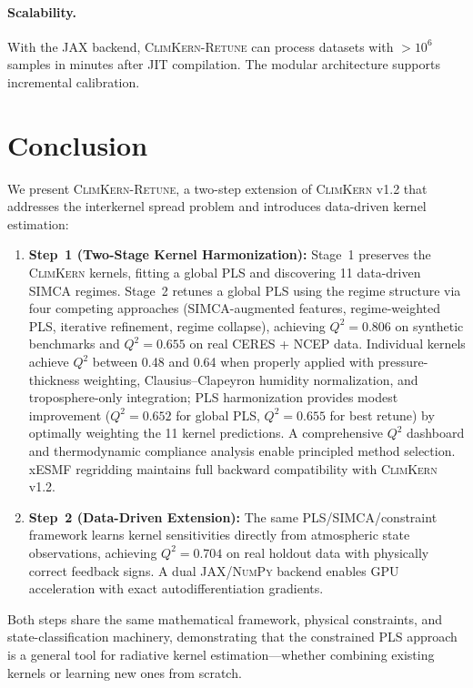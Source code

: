 \documentclass[11pt]{article}
\newcommand{\Qsq}{Q^{2}}
\newcommand{\climkern}{\textsc{ClimKern-Retune}}
\newcommand{\oldsystem}{\textsc{ClimKern}}
\newcommand{\jax}{\textsc{JAX}}
\newcommand{\numpy}{\textsc{NumPy}}
\begin{document}
\paragraph{Scalability.}
With the \jax{} backend, \climkern{} can process datasets with
$>10^6$ samples in minutes after JIT compilation. The modular
architecture supports incremental calibration.

\section{Conclusion}
\label{sec:conclusion}

We present \climkern{}, a two-step extension of \oldsystem{}
v1.2 that addresses the interkernel spread problem and
introduces data-driven kernel estimation:

\begin{enumerate}[noitemsep]
  \item \textbf{Step~1 (Two-Stage Kernel Harmonization):}
    Stage~1 preserves the \oldsystem{} kernels, fitting a global
    PLS and discovering 11 data-driven SIMCA regimes. Stage~2
    retunes a global PLS using the regime structure via four
    competing approaches (SIMCA-augmented features, regime-weighted
    PLS, iterative refinement, regime collapse), achieving
    $\Qsq = 0.806$ on synthetic benchmarks and $\Qsq = 0.655$ on
    real CERES + NCEP data. Individual kernels achieve $\Qsq$
    between 0.48 and 0.64 when properly applied with
    pressure-thickness weighting, Clausius--Clapeyron humidity
    normalization, and troposphere-only integration;
    PLS harmonization provides modest improvement ($\Qsq = 0.652$
    for global PLS, $\Qsq = 0.655$ for best retune) by optimally
    weighting the 11 kernel predictions. A comprehensive $\Qsq$
    dashboard and thermodynamic compliance analysis enable
    principled method selection. xESMF regridding maintains full
    backward compatibility with \oldsystem{} v1.2.
  \item \textbf{Step~2 (Data-Driven Extension):} The same
    PLS/SIMCA/constraint framework learns kernel sensitivities
    directly from atmospheric state observations, achieving
    $\Qsq = 0.704$ on real holdout data with physically correct
    feedback signs. A dual \jax{}/\numpy{} backend enables GPU
    acceleration with exact autodifferentiation gradients.
\end{enumerate}

Both steps share the same mathematical framework, physical
constraints, and state-classification machinery, demonstrating
that the constrained PLS approach is a general tool for
radiative kernel estimation---whether combining existing kernels
or learning new ones from scratch.
\end{document}

